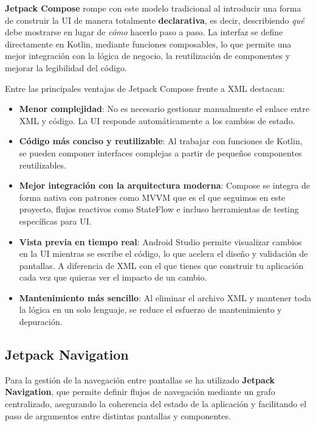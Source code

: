 \textbf{Jetpack Compose} rompe con este modelo tradicional al introducir una forma de construir la UI de manera totalmente \textbf{declarativa}, es decir, describiendo \textit{qué} debe mostrarse en lugar de \textit{cómo} hacerlo paso a paso. La interfaz se define directamente en Kotlin, mediante funciones composables, lo que permite una mejor integración con la lógica de negocio, la reutilización de componentes y mejorar la legibilidad del código.

Entre las principales ventajas de Jetpack Compose frente a XML destacan:

\begin{itemize}
    \item \textbf{Menor complejidad}: No es necesario gestionar manualmente el enlace entre XML y código. La UI responde automáticamente a los cambios de estado.

    \item \textbf{Código más conciso y reutilizable}: Al trabajar con funciones de Kotlin, se pueden componer interfaces complejas a partir de pequeños componentes reutilizables.

    \item \textbf{Mejor integración con la arquitectura moderna}: Compose se integra de forma nativa con patrones como MVVM que es el que seguimos en este proyecto, flujos reactivos como StateFlow e incluso herramientas de testing específicas para UI.

    \item \textbf{Vista previa en tiempo real}: Android Studio permite visualizar cambios en la UI mientras se escribe el código, lo que acelera el diseño y validación de pantallas. A diferencia de XML con el que tienes que construir tu aplicación cada vez que quieras ver el impacto de un cambio.

    \item \textbf{Mantenimiento más sencillo}: Al eliminar el archivo XML y mantener toda la lógica en un solo lenguaje, se reduce el esfuerzo de mantenimiento y depuración.
\end{itemize}


\subsection{Jetpack Navigation}

Para la gestión de la navegación entre pantallas se ha utilizado \textbf{Jetpack Navigation}, que permite definir flujos de navegación mediante un grafo centralizado, asegurando la coherencia del estado de la aplicación y facilitando el paso de argumentos entre distintas pantallas y componentes.


